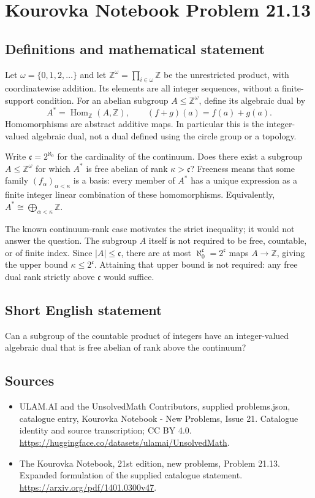 \documentclass[11pt,a4paper]{article}
\begin{document}
\section*{Kourovka Notebook Problem 21.13}\label{statement}

\subsection{Definitions and mathematical statement}
Let $\omega=\{0,1,2,\ldots\}$ and let
$\mathbb Z^\omega=\prod_{i\in\omega}\mathbb Z$ be the unrestricted
product, with coordinatewise addition. Its elements are all integer
sequences, without a finite-support condition. For an abelian subgroup
$A\le\mathbb Z^\omega$, define its algebraic dual by
\[
 A^*=\operatorname{Hom}_{\mathbb Z}(A,\mathbb Z),
 \qquad (f+g)(a)=f(a)+g(a).
\]
Homomorphisms are abstract additive maps. In particular this is the
integer-valued algebraic dual, not a dual defined using the circle
group or a topology.

Write $\mathfrak c=2^{\aleph_0}$ for the cardinality of the continuum.
Does there exist a subgroup $A\le\mathbb Z^\omega$ for which $A^*$ is
free abelian of rank $\kappa>\mathfrak c$? Freeness means that some
family $(f_\alpha)_{\alpha<\kappa}$ is a basis: every member of $A^*$
has a unique expression as a finite integer linear combination of
these homomorphisms. Equivalently,
$A^*\cong\bigoplus_{\alpha<\kappa}\mathbb Z$.

The known continuum-rank case motivates the strict inequality; it
would not answer the question. The subgroup $A$ itself is not required
to be free, countable, or of finite index. Since $|A|\le\mathfrak c$,
there are at most $\aleph_0^{\mathfrak c}=2^{\mathfrak c}$ maps
$A\to\mathbb Z$, giving the upper bound
$\kappa\le2^{\mathfrak c}$. Attaining that upper bound is not required:
any free dual rank strictly above $\mathfrak c$ would suffice.
\subsection{Short English statement}
Can a subgroup of the countable product of integers have an integer-valued algebraic dual that is free abelian of rank above the continuum?
\subsection{Sources}
\begin{itemize}
\item[S1] ULAM.AI and the UnsolvedMath Contributors, supplied problems.json, catalogue entry, Kourovka Notebook - New Problems, Issue 21. Catalogue identity and source transcription; CC BY 4.0.
\url{https://huggingface.co/datasets/ulamai/UnsolvedMath}.
\item[S2] The Kourovka Notebook, 21st edition, new problems, Problem 21.13. Expanded formulation of the supplied catalogue statement.
\url{https://arxiv.org/pdf/1401.0300v47}.
\end{itemize}
\end{document}

